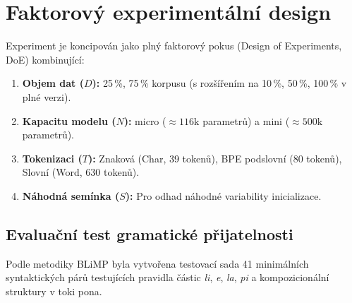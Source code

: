 \chapter{Faktorový experimentální design}
\label{chap:doe}

Experiment je koncipován jako plný faktorový pokus (Design of Experiments, DoE) kombinující:
\begin{enumerate}
    \item \textbf{Objem dat ($D$):} 25\,\%, 75\,\% korpusu (s rozšířením na 10\,\%, 50\,\%, 100\,\% v plné verzi).
    \item \textbf{Kapacitu modelu ($N$):} micro ($\approx 116\text{k}$ parametrů) a mini ($\approx 500\text{k}$ parametrů).
    \item \textbf{Tokenizaci ($T$):} Znaková (Char, 39 tokenů), BPE podslovní (80 tokenů), Slovní (Word, 630 tokenů).
    \item \textbf{Náhodná semínka ($S$):} Pro odhad náhodné variability inicializace.
\end{enumerate}

\section{Evaluační test gramatické přijatelnosti}
Podle metodiky BLiMP \cite{warstadt2020blimp} byla vytvořena testovací sada 41 minimálních syntaktických párů testujících pravidla částic \textit{li}, \textit{e}, \textit{la}, \textit{pi} a kompozicionální struktury v toki pona.
